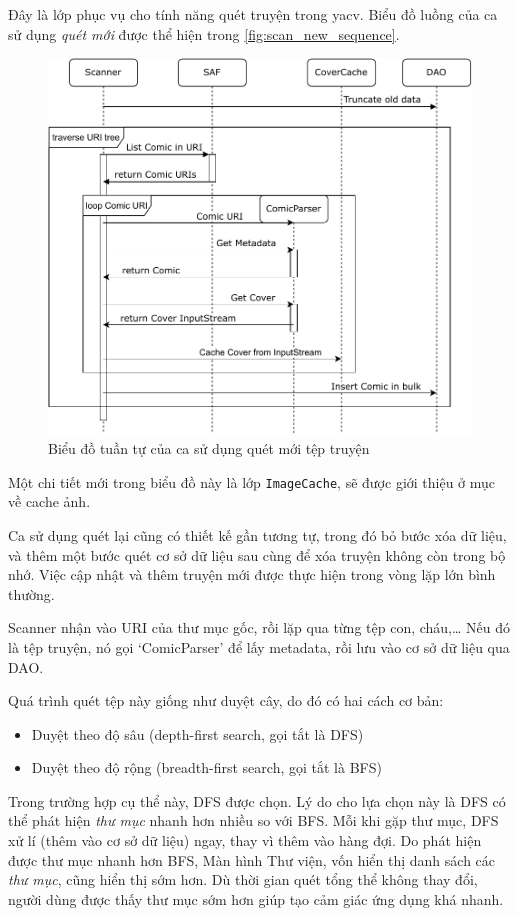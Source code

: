 \documentclass[../../../../thesis]{subfiles}
\begin{document}
Đây là lớp phục vụ cho tính năng quét truyện trong yacv. Biểu đồ luồng của ca sử
dụng \emph{quét mới} được thể hiện trong \autoref{fig:scan_new_sequence}.

\begin{figure}[H]
    \centering
    \includegraphics[scale=0.8]{../images/scan_new_sequence.pdf}
    \caption{Biểu đồ tuần tự của ca sử dụng quét mới tệp truyện}
    \label{fig:scan_new_sequence}
\end{figure}

Một chi tiết mới trong biểu đồ này là lớp \texttt{ImageCache}, sẽ được giới
thiệu ở mục về cache ảnh.

Ca sử dụng quét lại cũng có thiết kế gần tương tự, trong đó bỏ bước xóa dữ liệu,
và thêm một bước quét cơ sở dữ liệu sau cùng để xóa truyện không còn trong bộ
nhớ. Việc cập nhật và thêm truyện mới được thực hiện trong vòng lặp lớn bình
thường.

Scanner nhận vào URI của thư mục gốc, rồi lặp qua từng tệp con, cháu,\ldots{}
Nếu đó là tệp truyện, nó gọi `ComicParser' để lấy metadata, rồi lưu vào cơ sở dữ
liệu qua DAO.

Quá trình quét tệp này giống như duyệt cây, do đó có hai cách cơ bản:

\begin{itemize}
    \item
        Duyệt theo độ sâu (depth-first search, gọi tắt là DFS)
    \item
        Duyệt theo độ rộng (breadth-first search, gọi tắt là BFS)
\end{itemize}

Trong trường hợp cụ thể này, DFS được chọn. Lý do cho lựa chọn này là DFS có thể
phát hiện \emph{thư mục} nhanh hơn nhiều so với BFS. Mỗi khi gặp thư mục, DFS xử
lí (thêm vào cơ sở dữ liệu) ngay, thay vì thêm vào hàng đợi. Do phát hiện được
thư mục nhanh hơn BFS, Màn hình Thư viện, vốn hiển thị danh sách các \emph{thư
mục}, cũng hiển thị sớm hơn. Dù thời gian quét tổng thể không thay đổi, người
dùng được thấy thư mục sớm hơn giúp tạo cảm giác ứng dụng khá nhanh.
\end{document}

